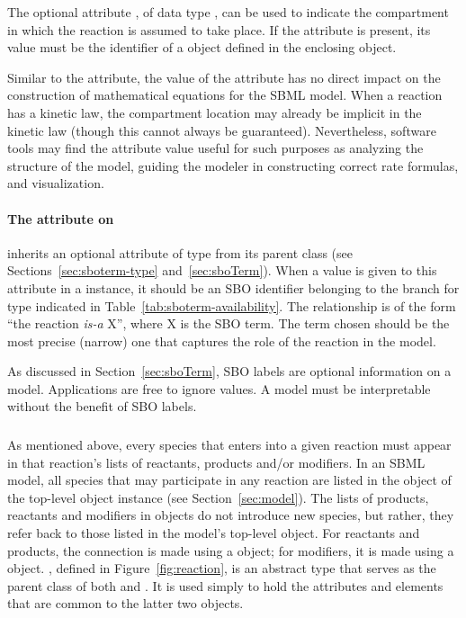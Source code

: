 The optional attribute , of data type
, can be used to indicate the compartment in
which the reaction is assumed to take place.  If the attribute is
present, its value must be the identifier of a \Compartment object
defined in the enclosing \Model object.

Similar to the  attribute, the value of the
 attribute has no direct impact on the
construction of mathematical equations for the SBML model.  When a
reaction has a kinetic law, the compartment location may already
be implicit in the kinetic law (though this cannot always be
guaranteed).  Nevertheless, software tools may find the
 attribute value useful for such purposes as
analyzing the structure of the model, guiding the modeler in
constructing correct rate formulas, and visualization.


\paragraph{The  attribute on }
\label{sec:reaction-sboterm}

\Reaction inherits an optional 
attribute of type  from its parent
class \SBase (see Sections~\ref{sec:sboterm-type}
and~\ref{sec:sboTerm}).  When a value is given to this
attribute in a  \Reaction instance, it should be an
SBO identifier belonging to the branch for type  \Reaction  
indicated in Table~\ref{tab:sboterm-availability}.  The relationship is
of the form ``the reaction \emph{is-a} X'', where X is
the SBO term.  The term chosen should be the most precise (narrow)
one that captures the role of the reaction in the model.

As discussed in Section~\ref{sec:sboTerm}, SBO labels are optional
information on a model.  Applications are free to ignore
 values.  A model must be interpretable without the
benefit of SBO labels.


\subsubsection{}
\label{subsec:simplespeciesreference}

As mentioned above, every species that enters into a given
reaction must appear in that reaction's lists of reactants,
products and/or modifiers.  In an SBML model, all species that may
participate in any reaction are listed in the \ListOfSpecies
object of the top-level \Model object instance (see
Section~\ref{sec:model}).  The lists of products, reactants and
modifiers in \Reaction objects do not introduce new species, but
rather, they refer back to those listed in the model's top-level
\ListOfSpecies object.  For reactants and products, the connection
is made using a \SpeciesReference object; for modifiers, it is
made using a \ModifierSpeciesReference object.
\SimpleSpeciesReference, defined in Figure~\vref{fig:reaction}, is
an abstract type that serves as the parent class of both
\SpeciesReference and \ModifierSpeciesReference.  It is used
simply to hold the attributes and elements that are common to the
latter two objects.



